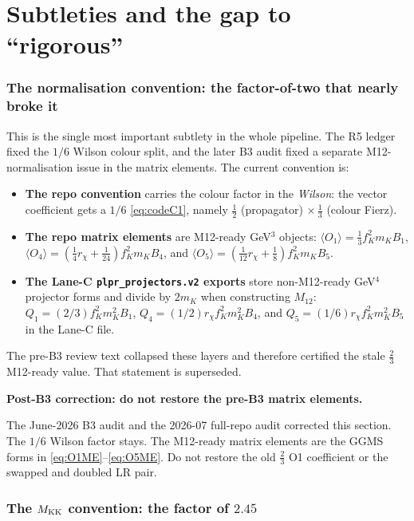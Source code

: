 \documentclass[11pt]{article}
\newenvironment{callout}[1]{%
  \par\medskip\begin{shaded}\noindent\textbf{#1}\par\smallskip}{\end{shaded}\medskip}
\newcommand{\half}{\tfrac{1}{2}}
\newcommand{\code}[1]{\texttt{#1}}
\theoremstyle{definition}
\begin{document}
\part{Subtleties and the gap to ``rigorous''}
\label{part:subtle}

\section{The normalisation convention: the factor-of-two that nearly broke it}
\label{sec:r5}

This is the single most important subtlety in the whole pipeline. The R5 ledger
fixed the $1/6$ Wilson colour split, and the later B3 audit fixed a separate
M12-normalisation issue in the matrix elements. The current convention is:
\begin{itemize}[leftmargin=1.4em]
\item \textbf{The repo convention} carries the colour factor in the
\emph{Wilson}: the vector coefficient gets a $1/6$ \eqref{eq:codeC1}, namely
$\half$ (propagator) $\times\,\tfrac13$ (colour Fierz).
\item \textbf{The repo matrix elements} are M12-ready GeV$^3$ objects:
$\langle O_1\rangle=\tfrac13 f_K^2 m_K B_1$,
$\langle O_4\rangle=(\tfrac14 r_\chi+\tfrac{1}{24})f_K^2 m_K B_4$, and
$\langle O_5\rangle=(\tfrac{1}{12} r_\chi+\tfrac18)f_K^2 m_K B_5$.
\item \textbf{The Lane-C \code{plpr\_projectors.v2} exports} store non-M12-ready
GeV$^4$ projector forms and divide by $2m_K$ when constructing $M_{12}$:
$Q_1=(2/3)f_K^2m_K^2B_1$, $Q_4=(1/2)r_\chi f_K^2m_K^2B_4$, and
$Q_5=(1/6)r_\chi f_K^2m_K^2B_5$ in the Lane-C file.
\end{itemize}
The pre-B3 review text collapsed these layers and therefore certified the stale
$\tfrac23$ M12-ready value. That statement is superseded.

\begin{callout}{Post-B3 correction: do not restore the pre-B3 matrix elements.}
The June-2026 B3 audit and the 2026-07 full-repo audit corrected this section.
The $1/6$ Wilson factor stays. The M12-ready matrix elements are the GGMS forms
in \eqref{eq:O1ME}--\eqref{eq:O5ME}. Do not restore the old $\tfrac23$ O1
coefficient or the swapped and doubled LR pair.
\end{callout}

\section{The $M_{\rm KK}$ convention: the factor of $2.45$}
\label{sec:mkkconv}
\end{document}
